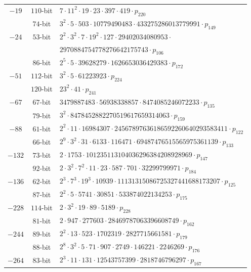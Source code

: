 \documentclass[version=preprint]{iacrcc}
\begin{document}
\begin{table}[!ht]
\begin{tabularx}{\textwidth}{ccl}
$-19$ & $110$-bit & $7  \cdot 11^{2}  \cdot 19  \cdot 23  \cdot 397  \cdot 419  \cdot p_{220}$\\
 & $74$-bit & $3^{2}  \cdot 5  \cdot 503  \cdot 10779490483  \cdot 433275286013779991  \cdot p_{149}$\\
$-24$ & $53$-bit & $2^{2}  \cdot 3^{2}  \cdot 7  \cdot 19^{2}  \cdot 127  \cdot 29402034080953  \cdot$\\
      &          & $2970884754778276642175743  \cdot p_{106}$\\
 & $86$-bit & $2^{5}  \cdot 5  \cdot 39628279  \cdot 1626653036429383  \cdot p_{172}$\\
$-51$ & $112$-bit & $3^{2}  \cdot 5  \cdot 61223923  \cdot p_{224}$\\
 & $120$-bit & $23^{2}  \cdot 41  \cdot p_{241}$\\
$-67$ & $67$-bit & $3479887483  \cdot 56938338857  \cdot 8474085246072233  \cdot p_{135}$\\
 & $79$-bit & $3^{2}  \cdot 8478452882270519617659314063  \cdot p_{159}$\\
$-88$ & $61$-bit & $2^{2}  \cdot 11  \cdot 16984307  \cdot 24567897636186592260640293583411  \cdot p_{122}$\\
 & $66$-bit & $2^{9}  \cdot 3^{2}  \cdot 31  \cdot 6133  \cdot 116471  \cdot 69487476515565975361139  \cdot p_{133}$\\
$-132$ & $73$-bit & $2  \cdot 1753  \cdot 101235113104036296384208928969  \cdot p_{147}$\\
 & $92$-bit & $2  \cdot 3^{2}  \cdot 7^{2}  \cdot 11  \cdot 23  \cdot 587  \cdot 701  \cdot 32299799971  \cdot p_{184}$\\
$-136$ & $62$-bit & $2^{3}  \cdot 7^{3}  \cdot 19^{3}  \cdot 10939  \cdot 11131315086725327441688173207  \cdot p_{125}$\\
 & $87$-bit & $2^{2}  \cdot 5  \cdot 5741  \cdot 30851  \cdot 533874022134253  \cdot p_{175}$\\
$-228$ & $114$-bit & $2  \cdot 3^{2}  \cdot 19  \cdot 89  \cdot 5189  \cdot p_{228}$\\
 & $81$-bit & $2  \cdot 947  \cdot 277603  \cdot 28469787063396608749  \cdot p_{162}$\\
$-244$ & $89$-bit & $2^{2}  \cdot 13  \cdot 523  \cdot 1702319  \cdot 2827715661581  \cdot p_{179}$\\
 & $88$-bit & $2^{8}  \cdot 3^{2}  \cdot 5  \cdot 71  \cdot 907  \cdot 2749  \cdot 146221  \cdot 2246269  \cdot p_{176}$\\
$-264$ & $83$-bit & $2^{3}  \cdot 11  \cdot 131  \cdot 12543757399  \cdot 2818746796297  \cdot p_{167}$\\

\end{tabularx}
\end{table}
\end{document}
